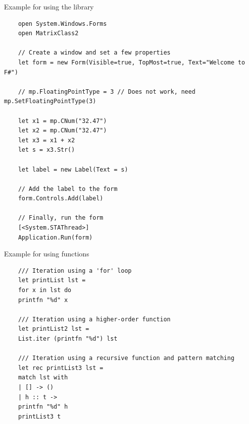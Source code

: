 	
	
	\vpara
	Example for using the library
	
	\begin{lstlisting}
	open System.Windows.Forms
	open MatrixClass2
	
	// Create a window and set a few properties
	let form = new Form(Visible=true, TopMost=true, Text="Welcome to F#")
	
	// mp.FloatingPointType = 3 // Does not work, need mp.SetFloatingPointType(3)
	
	let x1 = mp.CNum("32.47")
	let x2 = mp.CNum("32.47")
	let x3 = x1 + x2
	let s = x3.Str()
	
	let label = new Label(Text = s)
	
	// Add the label to the form
	form.Controls.Add(label)
	
	// Finally, run the form
	[<System.STAThread>]
	Application.Run(form)
	\end{lstlisting}
	
	
	
	
	\vpara
	Example for using functions
	
	\begin{lstlisting}
	/// Iteration using a 'for' loop
	let printList lst = 
	for x in lst do
	printfn "%d" x
	
	/// Iteration using a higher-order function
	let printList2 lst = 
	List.iter (printfn "%d") lst
	
	/// Iteration using a recursive function and pattern matching
	let rec printList3 lst =
	match lst with
	| [] -> ()
	| h :: t ->
	printfn "%d" h
	printList3 t
	
	\end{lstlisting}
	
	
	
	
	
	
	
	
	
